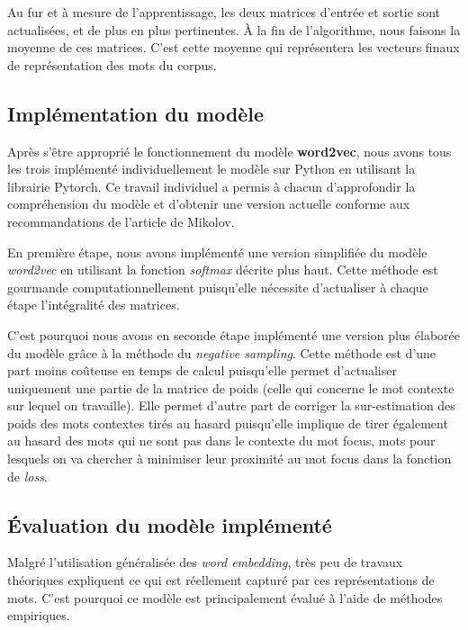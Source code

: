 \documentclass[11pt,french,french]{article}
\begin{document}
Au fur et à mesure de l'apprentissage, les deux matrices d'entrée et
sortie sont actualisées, et de plus en plus pertinentes. À la fin de
l'algorithme, nous faisons la moyenne de ces matrices. C'est cette
moyenne qui représentera les vecteurs finaux de représentation des mots
du corpus.

\hypertarget{impluxe9mentation-du-moduxe8le}{%
\subsection{Implémentation du
modèle}\label{impluxe9mentation-du-moduxe8le}}

Après s'être approprié le fonctionnement du modèle \textbf{word2vec},
nous avons tous les trois implémenté individuellement le modèle sur
Python en utilisant la librairie Pytorch. Ce travail individuel a permis
à chacun d'approfondir la compréhension du modèle et d'obtenir une
version actuelle conforme aux recommandations de l'article de Mikolov.

En première étape, nous avons implémenté une version simplifiée du
modèle \emph{word2vec} en utilisant la fonction \emph{softmax} décrite
plus haut. Cette méthode est gourmande computationnellement puisqu'elle
nécessite d'actualiser à chaque étape l'intégralité des matrices.

C'est pourquoi nous avons en seconde étape implémenté une version plus
élaborée du modèle grâce à la méthode du \emph{negative sampling}. Cette
méthode est d'une part moins coûteuse en temps de calcul puisqu'elle
permet d'actualiser uniquement une partie de la matrice de poids (celle
qui concerne le mot contexte sur lequel on travaille). Elle permet
d'autre part de corriger la sur-estimation des poids des mots contextes
tirés au hasard puisqu'elle implique de tirer également au hasard des
mots qui ne sont pas dans le contexte du mot focus, mots pour lesquels
on va chercher à minimiser leur proximité au mot focus dans la fonction
de \emph{loss}.

\hypertarget{uxe9valuation-du-moduxe8le-impluxe9mentuxe9}{%
\subsection{Évaluation du modèle
implémenté}\label{uxe9valuation-du-moduxe8le-impluxe9mentuxe9}}

Malgré l'utilisation généralisée des \emph{word embedding}, très peu de
travaux théoriques expliquent ce qui est réellement capturé par ces
représentations de mots. C'est pourquoi ce modèle est principalement
évalué à l'aide de méthodes empiriques.
\end{document}
